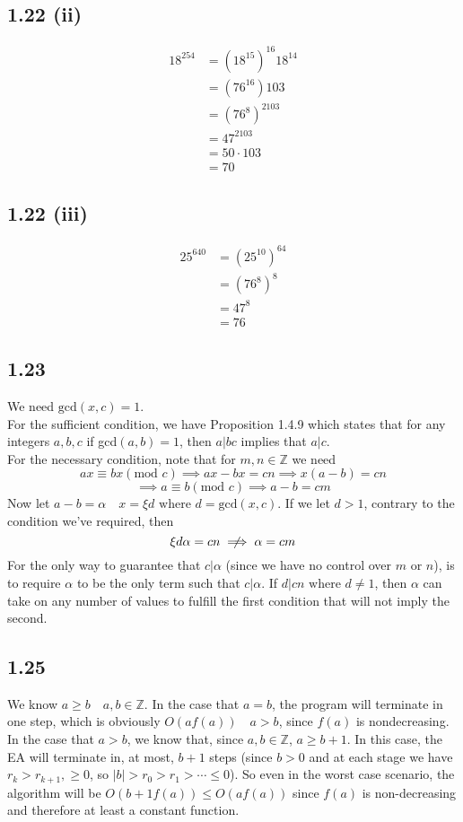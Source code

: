 \documentclass[letterpaper,12pt]{article}
\theoremstyle{definition}
\begin{document}
\subsection*{1.22 (ii)}
\begin{align*}
    18^{254} &= (18^{15})^{16}18^{14}
    \\&=(76^{16})103
    \\&=(76^8)^2103
    \\&=47^2103
    \\&=50 \cdot 103
    \\&=70
\end{align*}
\subsection*{1.22 (iii)}
\begin{align*}
    25^{640} &= (25^{10})^{64}
    \\&=(76^8)^8
    \\&=47^8
    \\&=76
\end{align*}
\subsection*{1.23}
We need $\text{gcd}(x,c) = 1$.
\\
For the sufficient condition, we have Proposition 1.4.9 which states that for any integers $a,b,c$ if gcd$(a,b) = 1$, then $a\vert bc$ implies that $a \vert c$. 
\\
For the necessary condition, note that for $m,n \in \mathbb{Z}$ we need
\[ ax \equiv bx (\text{mod }c) \implies ax - bx = cn \implies x(a-b) = cn \]
\[\implies a \equiv b (\text{mod }c) \implies a - b = cm \]
Now let $a-b = \alpha \quad x = \xi d \text{ where } d= \text{gcd}(x,c)$. If we let $d > 1$, contrary to the condition we've required, then
\[ \xi d \alpha = cn \centernot\implies \alpha = cm\]
For the only way to guarantee that $c\vert \alpha $ (since we have no control over $m$ or $n$), is to require $\alpha$ to be the only term such that $c \vert \alpha$. If $d \vert cn \text{ where }d \neq 1$, then $\alpha$ can take on any number of values to fulfill the first condition that will not imply the second.


\subsection*{1.25}
We know $a \geq b \quad a,b \in \mathbb{Z}$. 
In the case that $a=b$, the program will terminate in one step, which is obviously $O(af(a)) \quad a > b$, since $f(a)$ is nondecreasing. 
In the case that $a>b$, we know that, since $a,b \in \mathbb{Z}$, $a \geq b + 1$. In this case, the EA will terminate in, at most, $b + 1$ steps (since $b > 0$ and at each stage we have $r_k > r_{k+1}, \geq 0$, so $|b| > r_0 > r_1 > \cdots \leq 0$). So even in the worst case scenario, the algorithm will be $O(b+1f(a)) \leq O(af(a))$ since $f(a)$ is non-decreasing and therefore at least a constant function.
\end{document}
